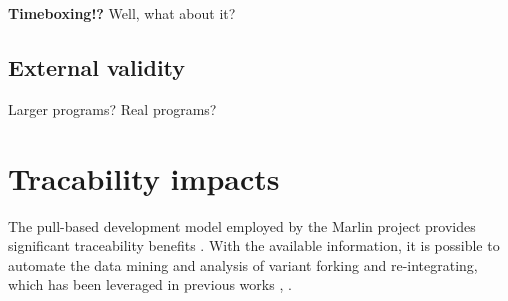 \textbf{Timeboxing!?} Well, what about it?

\subsection{External validity}
Larger programs?
Real programs?


\section{Tracability impacts}
The pull-based development model employed by the Marlin project provides significant traceability benefits \cite{gousios2014pullreq}. With the available information, it is possible to automate the data mining and analysis of variant forking and re-integrating, which has been leveraged in previous works \cite{stanciulescu2015}, \cite{stanciulescu2016concepts}.
